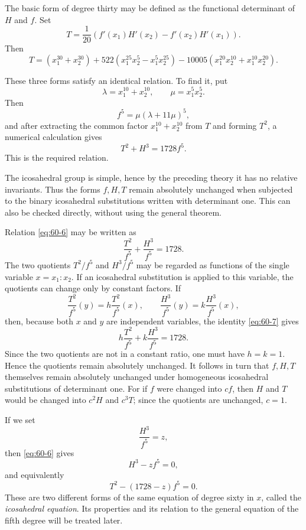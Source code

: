 \documentclass[11pt]{article}
\begin{document}
The basic form of degree thirty may be defined as the functional determinant of \(H\) and \(f\).  Set
\begin{equation}\label{eq:60-4}
 T=\frac1{20}\left(f'(x_1)H'(x_2)-f'(x_2)H'(x_1)\right).
\end{equation}
Then
\begin{equation}\label{eq:60-5}
 T=(x_1^{30}+x_2^{30})+522(x_1^{25}x_2^5-x_1^5x_2^{25})-10005(x_1^{20}x_2^{10}+x_1^{10}x_2^{20}).
\end{equation}

These three forms satisfy an identical relation.  To find it, put
\[
 \lambda=x_1^{10}+x_2^{10},
 \qquad
 \mu=x_1^5x_2^5.
\]
Then
\[
 f^5=\mu(\lambda+11\mu)^5,
\]
and after extracting the common factor \(x_1^{10}+x_2^{10}\) from \(T\) and forming \(T^2\), a numerical calculation gives
\begin{equation}\label{eq:60-6}
 T^2+H^3=1728f^5.
\end{equation}
This is the required relation.

The icosahedral group is simple, hence by the preceding theory it has no relative invariants.  Thus the forms \(f,H,T\) remain absolutely unchanged when subjected to the binary icosahedral substitutions written with determinant one.  This can also be checked directly, without using the general theorem.

Relation \eqref{eq:60-6} may be written as
\begin{equation}\label{eq:60-7}
 \frac{T^2}{f^5}+\frac{H^3}{f^5}=1728.
\end{equation}
The two quotients \(T^2/f^5\) and \(H^3/f^5\) may be regarded as functions of the single variable \(x=x_1:x_2\).  If an icosahedral substitution is applied to this variable, the quotients can change only by constant factors.  If
\[
 \frac{T^2}{f^5}(y)=h\frac{T^2}{f^5}(x),
 \qquad
 \frac{H^3}{f^5}(y)=k\frac{H^3}{f^5}(x),
\]
then, because both \(x\) and \(y\) are independent variables, the identity \eqref{eq:60-7} gives
\[
 h\frac{T^2}{f^5}+k\frac{H^3}{f^5}=1728.
\]
Since the two quotients are not in a constant ratio, one must have \(h=k=1\).  Hence the quotients remain absolutely unchanged.  It follows in turn that \(f,H,T\) themselves remain absolutely unchanged under homogeneous icosahedral substitutions of determinant one.  For if \(f\) were changed into \(cf\), then \(H\) and \(T\) would be changed into \(c^2H\) and \(c^3T\); since the quotients are unchanged, \(c=1\).

If we set
\[
 \frac{H^3}{f^5}=z,
\]
then \eqref{eq:60-6} gives
\begin{equation}\label{eq:60-9}
 H^3-zf^5=0,
\end{equation}
and equivalently
\begin{equation}\label{eq:60-10}
 T^2-(1728-z)f^5=0.
\end{equation}
These are two different forms of the same equation of degree sixty in \(x\), called the \emph{icosahedral equation}.  Its properties and its relation to the general equation of the fifth degree will be treated later.
\end{document}
